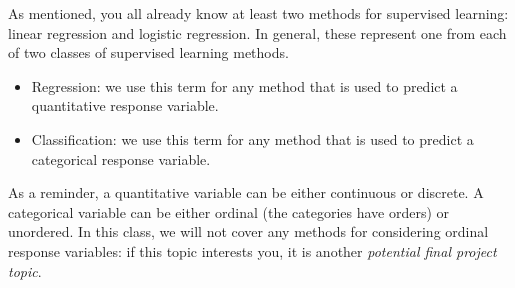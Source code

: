 \documentclass[titlepage,10pt]{scrartcl}
\begin{document}
As mentioned, you all already know at least two methods for supervised learning: linear regression and logistic regression. In general, these represent one from each of two classes of supervised learning methods.
\begin{itemize}
\item Regression: we use this term for any method that is used to predict a quantitative response variable.
\item Classification: we use this term for any method that is used to predict a categorical response variable. 
\end{itemize}
As a reminder, a quantitative variable can be either continuous or discrete. A categorical variable can be either ordinal (the categories have orders) or unordered. In this class, we will not cover any methods for considering ordinal response variables: if this topic interests you, it is another \emph{potential final project topic}. 
\end{document}
